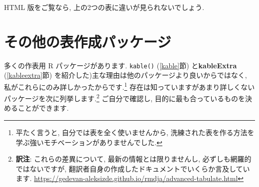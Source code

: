 \documentclass[
  11pt,
  lualatex,ja=standard,jafont=noto]{bxjsreport}
\begin{document}
\begin{table}
\centering
{}
\end{table}

HTML 版をご覧なら, 上の2つの表に違いが見られないでしょう.

\hypertarget{table-other}{%
\section{その他の表作成パッケージ}\label{table-other}}

多くの作表用 R パッケージがあります. \texttt{kable()} (\ref{kable}節) と\textbf{kableExtra} (\ref{kableextra}節) を紹介した)主な理由は他のパッケージより良いからではなく, 私がこれらにのみ詳しかったからです.\footnote{平たく言うと, 自分では表を全く使いませんから, 洗練された表を作る方法を学ぶ強いモチベーションがありませんでした.} 存在は知っていますがあまり詳しくないパッケージを次に列挙します.\footnote{\textbf{訳注}: これらの差異について, 最新の情報とは限りませんし, 必ずしも網羅的ではないですが, 翻訳者自身の作成したドキュメントでいくらか言及しています. \url{https://gedevan-aleksizde.github.io/rmdja/advanced-tabulate.html}} ご自分で確認し, 目的に最も合っているものを決めることができます.
\end{document}
